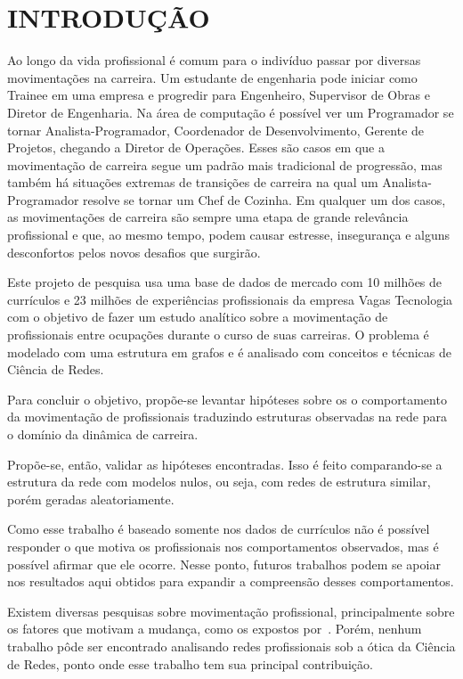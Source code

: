 \documentclass[12pt,a4paper,final]{article}
\begin{document}
\listoftodos[Notas]

\section{INTRODUÇÃO}

Ao longo da vida profissional é comum para o indivíduo passar por diversas movimentações na carreira. Um estudante de engenharia pode iniciar como Trainee em uma empresa e progredir para Engenheiro, Supervisor de Obras e Diretor de Engenharia. Na área de computação é possível ver um Programador se tornar Analista-Programador, Coordenador de Desenvolvimento, Gerente de Projetos, chegando a Diretor de Operações. Esses são casos em que a movimentação de carreira segue um padrão mais tradicional de progressão, mas também há situações extremas de transições de carreira na qual um Analista-Programador resolve se tornar um Chef de Cozinha. Em qualquer um dos casos, as movimentações de carreira são sempre uma etapa de grande relevância profissional e que, ao mesmo tempo, podem causar estresse, insegurança e alguns desconfortos pelos novos desafios que surgirão.

Este projeto de pesquisa usa uma base de dados de mercado com 10 milhões de currículos e 23 milhões de experiências profissionais da empresa Vagas Tecnologia com o objetivo de fazer um estudo analítico sobre a movimentação de profissionais entre ocupações durante o curso de suas carreiras. O problema é modelado com uma estrutura em grafos e é analisado com conceitos e técnicas de Ciência de Redes.

Para concluir o objetivo, propõe-se levantar hipóteses sobre os o comportamento da movimentação de profissionais traduzindo estruturas observadas na rede para o domínio da dinâmica de carreira.

Propõe-se, então, validar as hipóteses encontradas. Isso é feito comparando-se a estrutura da rede com modelos nulos, ou seja, com redes de estrutura similar, porém geradas aleatoriamente.

Como esse trabalho é baseado somente nos dados de currículos não é possível responder o que motiva os profissionais nos comportamentos observados, mas é possível afirmar que ele ocorre. Nesse ponto, futuros trabalhos podem se apoiar nos resultados aqui obtidos para expandir a compreensão desses comportamentos.

Existem diversas pesquisas sobre movimentação profissional, principalmente sobre os fatores que motivam a mudança, como os expostos por~. Porém, nenhum trabalho pôde ser encontrado analisando redes profissionais sob a ótica da Ciência de Redes, ponto onde esse trabalho tem sua principal contribuição.
\end{document}
